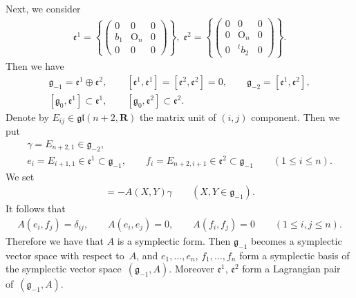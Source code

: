 \documentclass[11pt]{article}
\begin{document}
Next, we consider
\begin{gather*}  \mathfrak{e}^1=\left\{{\begin{pmatrix}
                      0 & 0 & 0 \\
                      b_1 & \mathrm{O}_n & 0 \\
                      0 & 0 & 0
                    \end{pmatrix}}\right\}, \;
  \mathfrak{e}^2=\left\{{\begin{pmatrix}
                      0 & 0 & 0 \\
                      0 & \mathrm{O}_n & 0 \\
                      0 & {}^tb_2 & 0
                     \end{pmatrix}}\right\}.
\end{gather*}
Then we have
\begin{gather*}
\mathfrak{g}_{-1}=\mathfrak{e}^1\oplus \mathfrak{e}^2,\qquad
[\mathfrak{e}^1,\mathfrak{e}^1]=[\mathfrak{e}^2,\mathfrak{e}^2]=0,\qquad
\mathfrak{g}_{-2}=[\mathfrak{e}^1,\mathfrak{e}^2],
\\
[\mathfrak{g}_0,\mathfrak{e}^1]
       \subset \mathfrak{e}^1,\qquad
       [\mathfrak{g}_0,\mathfrak{e}^2]
       \subset \mathfrak{e}^2.
\end{gather*}
Denote by $E_{ij}\in \mathfrak{gl}(n+2,{\mathbf{R}})$ the matrix unit of
$(i,j)$ component. Then we put
\begin{gather*}
\gamma =E_{n+2,1}\in \mathfrak{g}_{-2},\\
e_i =E_{i+1,1}\in
\mathfrak{e}^1\subset \mathfrak{g}_{-1},\qquad f_i=E_{n+2,i+1}\in
\mathfrak{e}^2\subset \mathfrak{g}_{-1}\qquad (1\leq i\leq n).
\end{gather*}
We set
\begin{gather*}
[X,Y] = - A(X,Y)\gamma \qquad (X,Y\in \mathfrak{g}_{-1}).
\end{gather*}
It follows that
\begin{gather*}
A(e_i,f_j)={\delta}_{ij}, \qquad A(e_i, e_j) = 0, \qquad A(f_i, f_j) = 0 \qquad  (1 \leq i, j \leq n).
\end{gather*}
Therefore we have that $A$ is a symplectic form.
Then $\mathfrak{g}_{-1}$ becomes a symplectic vector space with respect to~$A$,  and
$e_1, \dots, e_n$, $f_1, \dots, f_n$ form a symplectic basis of the symplectic vector space~$(\mathfrak{g}_{-1},A)$.
Moreover
$\mathfrak{e}^1$, $\mathfrak{e}^2$ form a Lagrangian pair of~$(\mathfrak{g}_{-1}, A)$.
\end{document}
